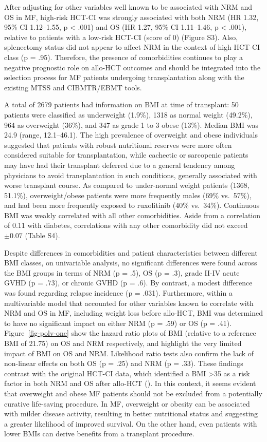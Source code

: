 \documentclass[
  letterpaper,
  paper=240mm:170mm,
  twoside=true,
  open=right,
  fontsize=10pt,
  pagesize=false,
  BCOR=15mm,
  DIV=14,
  headinclude=true,
  footinclude=false,
  headsepline=on]{scrbook}
\begin{document}
After adjusting for other variables well known to be associated with NRM
and OS in MF, high-risk HCT-CI was strongly associated with both NRM (HR
1.32, 95\% CI 1.12--1.55, p \textless{} .001) and OS (HR 1.27, 95\% CI
1.11--1.46, p \textless{} .001), relative to patients with a low-risk
HCT-CI (score of 0) (Figure S3). Also, splenectomy status did not appear
to affect NRM in the context of high HCT-CI class (p = .95). Therefore,
the presence of comorbidities continues to play a negative prognostic
role on allo-HCT outcomes and should be integrated into the selection
process for MF patients undergoing transplantation along with the
existing MTSS and CIBMTR/EBMT tools.

A total of 2679 patients had information on BMI at time of transplant:
50 patients were classified as underweight (1.9\%), 1318 as normal
weight (49.2\%), 964 as overweight (36\%), and 347 as grade 1 to 3 obese
(13\%). Median BMI was 24.9 (range, 12.1--46.1). The high prevalence of
overweight and obese individuals suggested that patients with robust
nutritional reserves were more often considered suitable for
transplantation, while cachectic or sarcopenic patients may have had
their transplant deferred due to a general tendency among physicians to
avoid transplantation in such conditions, generally associated with
worse transplant course. As compared to under-normal weight patients
(1368, 51.1\%), overweight/obese patients were more frequently males
(69\% vs.~57\%), and had been more frequently exposed to ruxolitinib
(40\% vs.~34\%). Continuous BMI was weakly correlated with all other
comorbidities. Aside from a correlation of 0.11 with diabetes,
correlations with any other comorbidity did not exceed \(\pm0.07\)
(Table S4).

Despite differences in comorbidities and patient characteristics between
different BMI classes, on univariable analysis, no significant
differences were found across the BMI groups in terms of NRM (p = .5),
OS (p = .3), grade II-IV acute GVHD (p = .73), or chronic GVHD (p = .6).
By contrast, a modest difference was found regarding relapse incidence
(p = .031). Furthermore, within a multivariable model that accounted for
other variables known to correlate with NRM and OS in MF, including
weight loss before allo-HCT, BMI was determined to have no significant
impact on either NRM (p = .59) or OS (p = .41).
Figure~\ref{fig-polv-one} show the hazard ratio plots of BMI (relative
to a reference BMI of 21.75) on OS and NRM respectively, and highlight
the very limited impact of BMI on OS and NRM. Likelihood ratio tests
also confirm the lack of non-linear effects on both OS (p = .25) and NRM
(p = .33). These findings contrast with the original HCT-CI data, which
identified a BMI \textgreater35 as a risk factor in both NRM and OS
after allo-HCT
(). In this context, it seems evident that overweight
and obese MF patients should not be excluded from a potentially curative
life-saving procedure. In MF, overweight or obesity can be associated
with milder disease activity, resulting in better nutritional status and
suggesting a greater likelihood of improved survival. On the other hand,
even patients with lower BMIs can derive benefits from a transplant
procedure.
\end{document}
